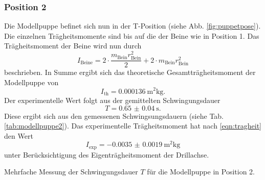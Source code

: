 \subsubsection{Position 2}
Die Modellpuppe befinet sich nun in der T-Position (siehe Abb. \ref{fig:puppetpose}).
Die einzelnen Trägheitsmomente sind bis auf die der Beine wie in Position 1.
Das Trägheitsmoment der Beine wird nun durch
\begin{equation*}
    I_\text{Beine} = 2 \cdot \frac{m_\text{Bein} r_\text{Bein}^2}{2} + 2 \cdot m_\text{Bein} r_\text{Bein}^2
\end{equation*} 
beschrieben.
In Summe ergibt sich das theoretische Gesamtträgheitsmoment der Modellpuppe von
\begin{equation*}
    I_\text{th} = \SI{0.000136}{\metre^2\kg} .
\end{equation*}
Der experimentelle Wert folgt aus der gemittelten Schwingungsdauer
\begin{equation*}
    T = \SI{0.65(4)}{\second} .
\end{equation*}
Diese ergibt sich aus den gemessenen Schwingsungsdauern (siehe Tab. \ref{tab:modellpuppe2}).
Das experimentelle Trägheitsmoment hat nach \autoref{eqn:tragheit} den Wert
\begin{equation*}
    I_\text{exp} = \SI{-0.0035(19)}{\metre^2\kg}
\end{equation*}
unter Berücksichtigung des Eigenträgheitsmoment der Drillachse.
\begin{table}
    \centering
    \caption{Mehrfache Messung der Schwingungsdauer $T$ für die Modellpuppe in Position 2.}
    \label{tab:modellpuppe2}  
\end{table}
\FloatBarrier